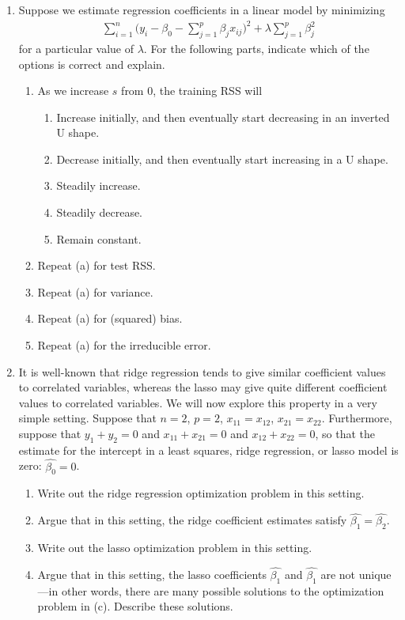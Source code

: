 \documentclass[../statistical_learning_notes.tex]{subfiles}
\begin{document}
\begin{enumerate}
        \item Suppose we estimate regression coefficients in a linear model by minimizing
        \begin{gather*}
            \sum_{i=1}^{n}\bigg( y_{i} - \beta_{0} - \sum_{j=1}^{p}\beta_{j}x_{ij} \bigg)^{2} + \lambda \sum_{j=1}^{p}\beta_{j}^{2}
        \end{gather*}
        for a particular value of $\lambda$. For the following parts, indicate which of the options is correct and explain.
        \begin{enumerate}
            \item As we increase $s$ from 0, the training RSS will
            \begin{enumerate}
                \item Increase initially, and then eventually start decreasing in an inverted U shape.
                \item Decrease initially, and then eventually start increasing in a U shape.
                \item Steadily increase.
                \item Steadily decrease.
                \item Remain constant.
            \end{enumerate}
            \item Repeat (a) for test RSS.
            \item Repeat (a) for variance.
            \item Repeat (a) for (squared) bias.
            \item Repeat (a) for the irreducible error.
        \end{enumerate}

        \item It is well-known that ridge regression tends to give similar coefficient values to correlated variables, whereas the lasso may give quite different coefficient values to correlated variables. We will now explore this property in a very simple setting.\newline
        Suppose that $n = 2$, $p = 2$, $x_{11} = x_{12}$, $x_{21} = x_{22}$. Furthermore, suppose that $y_{1} +y_{2} = 0$ and $x_{11} +x_{21} = 0$ and $x_{12} +x_{22} = 0$, so that the estimate for the intercept in a least squares, ridge regression, or lasso model is zero: $\hat{\beta_{0}} = 0$.
        \begin{enumerate}
        \item Write out the ridge regression optimization problem in this setting.
        \item Argue that in this setting, the ridge coefficient estimates satisfy $\hat{\beta_{1}} = \hat{\beta_{2}}$.
        \item Write out the lasso optimization problem in this setting.
        \item Argue that in this setting, the lasso coefficients $\hat{\beta_{1}}$ and $\hat{\beta_{1}}$ are not unique—in other words, there are many possible solutions to the optimization problem in (c). Describe these solutions.
        \end{enumerate}
        

\end{enumerate}
\end{document}
